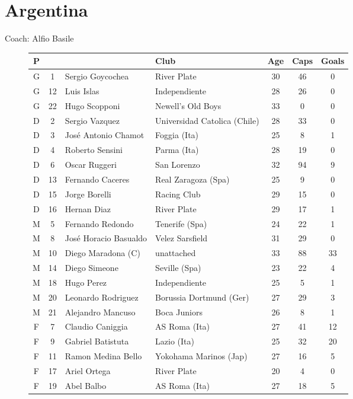 \chapter{Argentina}
\newline
\newline
Coach: Alfio Basile
\begin{figure}[H]
\begin{tabular}{c c l l c c c}
P & & & Club & Age & Caps & Goals \\ \hline
G & 1 & Sergio Goycochea & River Plate &  30 & 46 & 0 \\
G & 12 & Luis Islas & Independiente & 28 & 26 & 0 \\
G & 22 & Hugo Scopponi & Newell's Old Boys & 33 & 0 & 0 \\ \hline
D & 2 & Sergio Vazquez & Universidad Catolica (Chile) & 28 & 33 & 0 \\
D & 3 & Jos{\'e} Antonio Chamot & Foggia (Ita) & 25 & 8 & 1 \\
D & 4 & Roberto Sensini & Parma (Ita) & 28 & 19 & 0 \\
D & 6 & Oscar Ruggeri & San Lorenzo & 32 & 94 & 9 \\
D & 13 & Fernando Caceres & Real Zaragoza (Spa) & 25 & 9 & 0 \\
D & 15 & Jorge Borelli & Racing Club & 29 & 15 & 0 \\
D & 16 & Hernan Diaz & River Plate & 29 & 17 & 1 \\ \hline
M & 5 & Fernando Redondo & Tenerife (Spa) & 24 & 22 & 1 \\
M & 8 & Jos{\'e} Horacio Basualdo & Velez Sarsfield & 31 & 29 & 0 \\
M & 10 & Diego Maradona (C) & unattached & 33 & 88 & 33 \\
M & 14 & Diego Simeone & Seville (Spa) & 23 & 22 & 4 \\
M & 18 & Hugo Perez & Independiente & 25 & 5 & 1 \\
M & 20 & Leonardo Rodriguez & Borussia Dortmund (Ger) & 27 & 29 & 3 \\
M & 21 & Alejandro Mancuso & Boca Juniors & 26 & 8 & 1 \\ \hline
F & 7 & Claudio Caniggia & AS Roma (Ita) & 27 & 41 & 12 \\
F & 9 & Gabriel Batistuta & Lazio (Ita) & 25 & 32 & 20 \\
F & 11 & Ramon Medina Bello & Yokohama Marinos (Jap) & 27 & 16 & 5 \\
F & 17 & Ariel Ortega & River Plate & 20 & 4 & 0 \\
F & 19 & Abel Balbo & AS Roma (Ita) & 27 & 18 & 5 \\ \hline
\end{tabular}
\end{figure}
